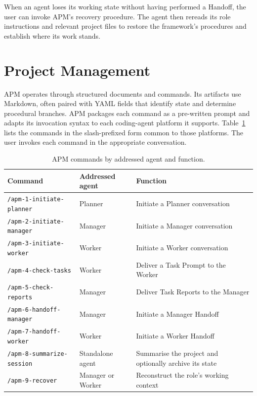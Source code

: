 When an agent loses its working state without having performed a Handoff, the user can invoke APM's recovery procedure. The agent then rereads its role instructions and relevant project files to restore the framework's procedures and establish where its work stands.

\section{Project Management}
\label{sec:framework-design-project-management}

APM operates through structured documents and commands. Its artifacts use Markdown, often paired with YAML fields that identify state and determine procedural branches. APM packages each command as a pre-written prompt and adapts its invocation syntax to each coding-agent platform it supports. Table~\ref{tab:framework-design-commands} lists the commands in the slash-prefixed form common to those platforms. The user invokes each command in the appropriate conversation.

\begin{table}[H]
  \centering
  \caption{APM commands by addressed agent and function.}
  \label{tab:framework-design-commands}
  \begin{tabular*}{\textwidth}{@{\extracolsep{\fill}}>{\raggedright\arraybackslash}p{}>{\raggedright\arraybackslash}p{}>{\raggedright\arraybackslash}p{}}
    \toprule
    Command & Addressed agent & Function \\
    \midrule
    \texttt{/apm-1-initiate-planner} & Planner & Initiate a Planner conversation \\
    \texttt{/apm-2-initiate-manager} & Manager & Initiate a Manager conversation \\
    \texttt{/apm-3-initiate-worker} & Worker & Initiate a Worker conversation \\
    \texttt{/apm-4-check-tasks} & Worker & Deliver a Task Prompt to the Worker \\
    \texttt{/apm-5-check-reports} & Manager & Deliver Task Reports to the Manager \\
    \texttt{/apm-6-handoff-manager} & Manager & Initiate a Manager Handoff \\
    \texttt{/apm-7-handoff-worker} & Worker & Initiate a Worker Handoff \\
    \texttt{/apm-8-summarize-session} & Standalone agent & Summarise the project and optionally archive its state \\
    \texttt{/apm-9-recover} & Manager or Worker & Reconstruct the role's working context \\
    \bottomrule
  \end{tabular*}
\end{table}

